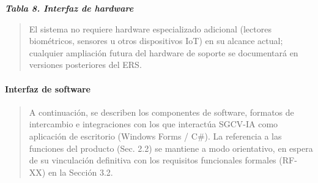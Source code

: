 \protect{}\label{table8}{}\emph{\textbf{Tabla 8.
Interfaz de hardware}}

\begin{quote}
El sistema no requiere hardware especializado adicional (lectores
biométricos, sensores u otros dispositivos IoT) en su alcance actual;
cualquier ampliación futura del hardware de soporte se documentará en
versiones posteriores del ERS.
\end{quote}

\paragraph{Interfaz de software}\label{interfaz-de-software}

\begin{quote}
A continuación, se describen los componentes de software, formatos de
intercambio e integraciones con los que interactúa SGCV-IA como
aplicación de escritorio (Windows Forms / C\#). La referencia a las
funciones del producto (Sec. 2.2) se mantiene a modo orientativo, en
espera de su vinculación definitiva con los requisitos funcionales
formales (RF-XX) en la Sección 3.2.
\end{quote}


